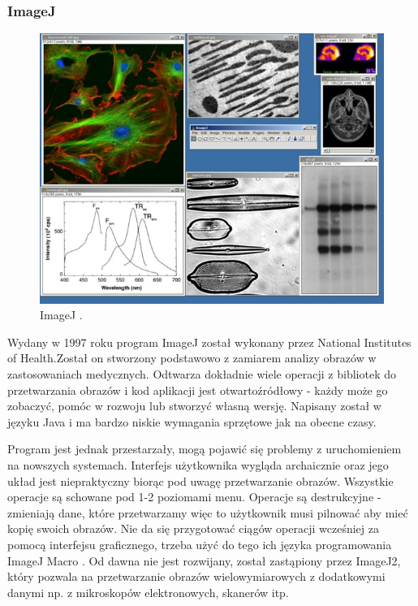 \subsubsection{ImageJ}
\begin{figure}[H]
    \centering
    \includegraphics[width=0.8\linewidth]{./images/Picture3.jpg}
    \caption{ImageJ \cite{imagej}.}
    \label{fig:imagej}
\end{figure}

Wydany w 1997 roku program ImageJ został wykonany przez National Institutes of Health.Został on stworzony podstawowo z zamiarem analizy obrazów w zastosowaniach medycznych. 
Odtwarza dokładnie wiele operacji z bibliotek do przetwarzania obrazów i kod aplikacji jest otwartoźródłowy - każdy może go zobaczyć, pomóc w rozwoju lub stworzyć własną wersję. 
Napisany został w języku Java i ma bardzo niskie wymagania sprzętowe jak na obecne czasy.

Program jest jednak przestarzały, mogą pojawić się problemy z uruchomieniem na nowszych systemach. Interfejs użytkownika wygląda archaicznie oraz jego układ jest niepraktyczny biorąc pod uwagę przetwarzanie obrazów. 
Wszystkie operacje są schowane pod 1-2 poziomami menu. 
Operacje są destrukcyjne - zmieniają dane, które przetwarzamy więc to użytkownik musi pilnować aby mieć kopię swoich obrazów. 
Nie da się przygotować ciągów operacji wcześniej za pomocą interfejsu graficznego, trzeba użyć do tego ich języka programowania ImageJ Macro \cite{imagejbatch}. 
Od dawna nie jest rozwijany, został zastąpiony przez ImageJ2, który pozwala na przetwarzanie obrazów wielowymiarowych z dodatkowymi danymi np. z mikroskopów elektronowych, skanerów itp.

